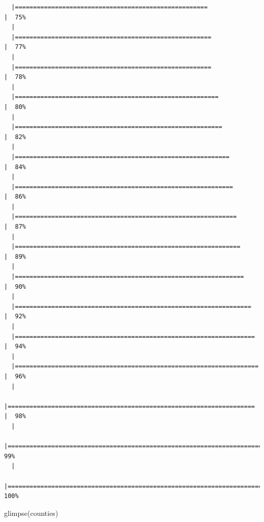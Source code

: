 \documentclass[
  letterpaper,
  DIV=11,
  numbers=noendperiod]{scrreprt}
\newenvironment{Shaded}{\begin{snugshade}}{\end{snugshade}}
\newcommand{\FunctionTok}[1]{\textcolor[rgb]{0.28,0.35,0.67}{#1}}
\newcommand{\NormalTok}[1]{\textcolor[rgb]{0.00,0.23,0.31}{#1}}
\begin{document}
\begin{verbatim}
  |=====================================================                 |  75%
  |                                                                            
  |======================================================                |  77%
  |                                                                            
  |======================================================                |  78%
  |                                                                            
  |========================================================              |  80%
  |                                                                            
  |=========================================================             |  82%
  |                                                                            
  |===========================================================           |  84%
  |                                                                            
  |============================================================          |  86%
  |                                                                            
  |=============================================================         |  87%
  |                                                                            
  |==============================================================        |  89%
  |                                                                            
  |===============================================================       |  90%
  |                                                                            
  |=================================================================     |  92%
  |                                                                            
  |==================================================================    |  94%
  |                                                                            
  |===================================================================   |  96%
  |                                                                            
  |====================================================================  |  98%
  |                                                                            
  |======================================================================|  99%
  |                                                                            
  |======================================================================| 100%
\end{verbatim}

\begin{Shaded}
\begin{Highlighting}[]
\FunctionTok{glimpse}\NormalTok{(counties)}
\end{Highlighting}
\end{Shaded}
\end{document}
